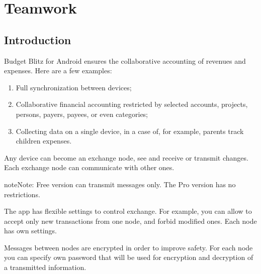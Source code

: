 \documentclass[a4paper,10pt,english]{sphinxmanual}
\begin{document}
\noindent{}
\noindent{}


\chapter{Teamwork}
\label{\detokenize{teamwork:teamwork}}\label{\detokenize{teamwork:chapter-teamwork}}\label{\detokenize{teamwork::doc}}

\section{Introduction}
\label{\detokenize{teamwork:introduction}}
Budget Blitz for Android ensures the collaborative accounting of revenues and expenses. Here are a few examples:
\begin{enumerate}
\def\theenumi{\arabic{enumi}}
\def\labelenumi{\theenumi .}
\makeatletter\def\p@enumii{\p@enumi \theenumi .}\makeatother
\item {} 
Full synchronization between devices;

\item {} 
Collaborative financial accounting restricted by selected accounts, projects, persons, payers, payees, or even categories;

\item {} 
Collecting data on a single device, in a case of, for example, parents track children expenses.

\end{enumerate}

Any device can become an exchange node, see {\hyperref[\detokenize{glossary:term-exchange-node}]{}} and receive or transmit changes.
Each exchange node can communicate with other ones.

\begin{sphinxadmonition}{note}{Note:}
Free version can transmit messages only. The Pro version has no restrictions.
\end{sphinxadmonition}

The app has flexible settings to control exchange. For example, you can allow to accept only new transactions
from one node, and forbid modified ones. Each node has own settings.

Messages between nodes are encrypted in order to improve safety. For each node you can specify
own password that will be used for encryption and decryption of a transmitted information.
\end{document}
